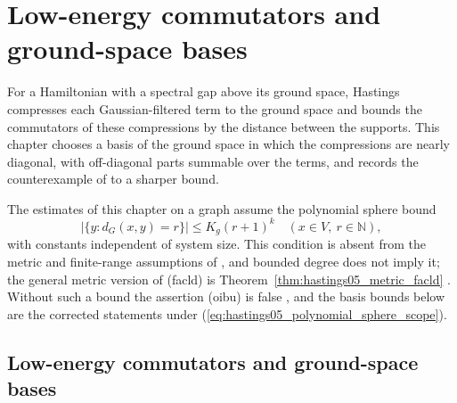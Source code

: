 \chapter{Low-energy commutators and ground-space bases}
\label{chap:low_energy_bases}

For a Hamiltonian with a spectral gap above its ground space, Hastings
\cite{Hastings2006Solving} compresses each Gaussian-filtered term to the
ground space and bounds the commutators of these compressions by the
distance between the supports. This chapter chooses a basis of the ground
space in which the compressions are nearly diagonal, with off-diagonal parts
summable over the terms, and records the counterexample of
\cite[Appendix B]{Hastings2006Solving} to a sharper bound.


The estimates of this chapter on a graph assume the polynomial sphere bound
\begin{equation}
    |\{y:d_G(x,y)=r\}|\le K_g(r+1)^k
    \quad(x\in V,\ r\in\mathbb N),
    \label{eq:hastings05_polynomial_sphere_scope}
\end{equation}
with constants independent of system size. This condition is absent from
the metric and finite-range assumptions of
\cite[lines 169--190]{Hastings2006Solving}, and bounded degree does not imply
it; the general metric version of (facld) is
Theorem~\ref{thm:hastings05_metric_facld}
\cite{gap:hastings05_geometric_growth_scope}. Without such a bound the
assertion (oibu) is false \cite{gap:hastings05_tree_basis_counterexample},
and the basis bounds below are the corrected statements under
(\ref{eq:hastings05_polynomial_sphere_scope}).

\section{Low-energy commutators and ground-space bases}
\label{sec:low_energy_bases}

